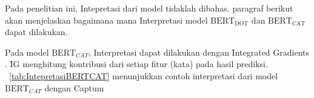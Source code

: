 Pada penelitian ini, Intepretasi dari model tidaklah dibahas. paragraf berikut akan menjelaskan bagaimana mana Interpretasi model $\text{BERT}_{\text{DOT}}$ dan $\text{BERT}_{\text{CAT}}$ dapat dilakukan.

Pada model $\text{BERT}_{CAT}$, Interpretasi dapat dilakukan dengan \f{Integrated Gradients} \citep{integratedgradient}. \f{IG} menghitung kontribusi dari setiap fitur (kata) pada hasil prediksi. \tab~\ref{tab:IntepretasiBERTCAT} menunjukkan contoh interpretasi dari model $\text{BERT}_{CAT}$ dengan Captum
